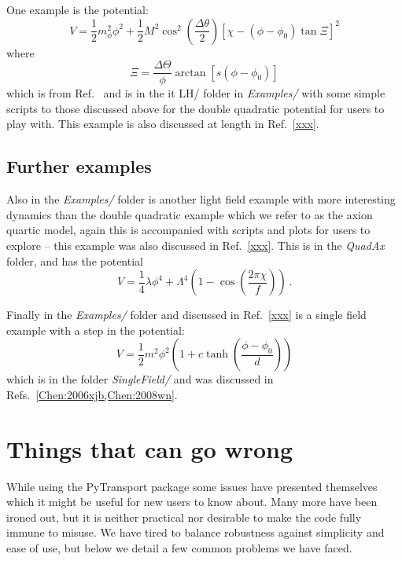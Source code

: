 \documentclass[10pt,
amsmath,amssymb,
aps,prd,nofootinbib,eqsecnum,a4paper]{revtex4}
\def\be{\begin{equation}}
\def\ee{\end{equation}}
\begin{document}
One example is the potential:
\be
V = \frac{1}{2} m^2_\phi \phi^2 + \frac{1}{2}M^2 \cos^2\left ( \frac{\Delta \theta}{2} \right) \left [\chi - (\phi - \phi_0 ) \tan \Xi \right]^2 
\ee
where 
\be
\Xi = \frac{\Delta \Theta}{\phi} \arctan[s (\phi - \phi_0)]
\ee
which is from Ref.~\cite{Gao:2013ota} and is in the {it LH/} folder in {\it Examples/} with some 
simple scripts to those discussed above for the double quadratic potential for users to play with. 
This example is also discussed at length in Ref.~\ref{xxx}.


\subsection{Further examples}
\label{other}

Also in the {\it Examples/} folder is another light field example with more interesting dynamics than the double quadratic 
example which we refer to as the axion quartic model, again this is accompanied 
with scripts and plots for users to explore -- this 
example was also discussed in Ref.~\ref{xxx}. This is in the {\it QuadAx} folder, and has the potential
\be
V = \frac{1}{4} \lambda \phi^4 + \Lambda^4 \left ( 1 - \cos \left ( \frac{2\pi \chi}{f} \right) \right )\,.
\ee

Finally in the {\it Examples/} folder and discussed in  Ref.~\ref{xxx} is a single field example with a step in the potential:
\be
V = \frac{1}{2} m^2 \phi^2 \left (1+c \tanh\left(\frac{\phi-\phi_0}{d} \right)\right)
\ee
which is in the folder {\it SingleField/} and was discussed in Refs.~\ref{Chen:2006xjb,Chen:2008wn}.


\section{Things that can go wrong}

While using the PyTransport package some issues have presented themselves which it might be useful 
for new users to know about. Many more have been ironed out, but it is neither practical nor desirable to make the code 
fully immune to misuse. We have tired to balance robustness against simplicity and ease of use, but 
below we detail a few common problems we have faced. 
\end{document}
